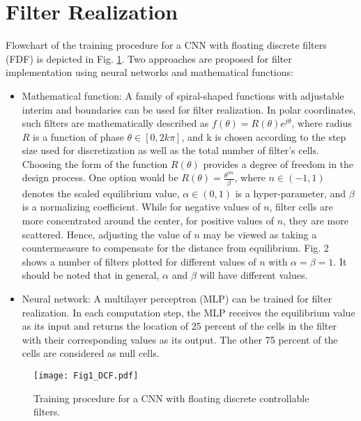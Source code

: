 \documentclass[journal]{IEEEtran}
\begin{document}
\section{Filter Realization}

Flowchart of the training procedure for a CNN with floating discrete filters (FDF) is depicted in Fig. \ref{CNNDCF}. Two approaches are proposed for filter implementation using neural networks and mathematical functions:
\begin{itemize}
\item Mathematical function: A family of spiral-shaped functions with adjustable interim and boundaries can be used for filter realization. In polar coordinates, such filters are mathematically described as $f(\theta)=R(\theta) e^{j\theta}$, where radius $R$ is a function of phase $\theta \in [0 , 2k\pi]$, and k is chosen according to the step size used for discretization as well as the total number of filter's cells. Choosing the form of the function $R(\theta)$ provides a degree of freedom in the design process. One option would be $R(\theta)=\frac{\theta^{\alpha n}}{\beta}$, where $n \in (-1 ,  1)$ denotes the scaled equilibrium value, $\alpha \in (0 ,  1)$ is a hyper-parameter, and $\beta$ is a normalizing coefficient. While for negative values of $n$, filter cells are more concentrated around the center, for positive values of $n$, they are more scattered. Hence, adjusting the value of $n$ may be viewed as taking a countermeasure to compensate for the distance from equilibrium. Fig. 2 shows a number of filters plotted for different values of $n$ with $\alpha= \beta=1$. It should be noted that in general, $\alpha$ and $\beta$ will have different values.
\item Neural network: A multilayer perceptron (MLP) \cite{haykin2010neural,gurney1997introduction} can be trained for filter realization. In each computation step, the MLP receives the equilibrium value as its input and returns the location of 25 percent of the cells in the filter with their corresponding values as its output. The other 75 percent of the cells are considered as null cells.  
\end{itemize}

\begin{figure}
\begin{center}
\texttt{[image: Fig1\_DCF.pdf]}    
\caption{Training procedure for a CNN with floating discrete controllable filters.} 
\label{CNNDCF}
\end{center}
\end{figure}
\end{document}
